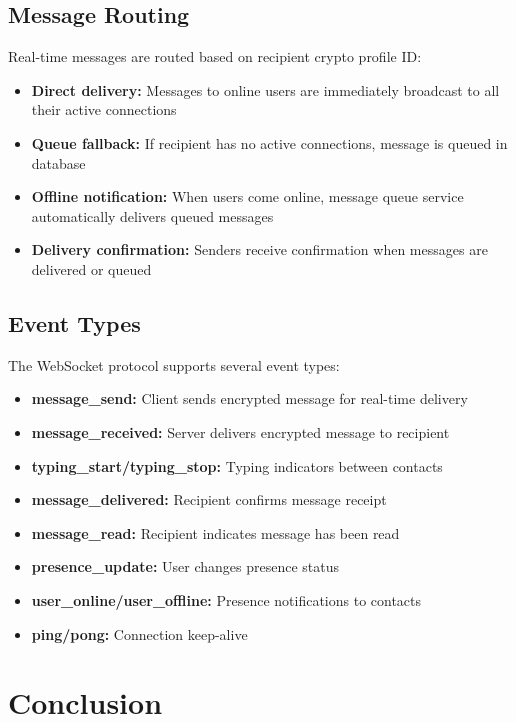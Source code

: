 \documentclass[12pt,a4paper,openany]{book}
\begin{document}
\subsection{Message Routing}

Real-time messages are routed based on recipient crypto profile ID:

\begin{itemize}
\item \textbf{Direct delivery:} Messages to online users are immediately broadcast to all their active connections
\item \textbf{Queue fallback:} If recipient has no active connections, message is queued in database
\item \textbf{Offline notification:} When users come online, message queue service automatically delivers queued messages
\item \textbf{Delivery confirmation:} Senders receive confirmation when messages are delivered or queued
\end{itemize}

\subsection{Event Types}

The WebSocket protocol supports several event types:

\begin{itemize}
\item \textbf{message\_send:} Client sends encrypted message for real-time delivery
\item \textbf{message\_received:} Server delivers encrypted message to recipient
\item \textbf{typing\_start/typing\_stop:} Typing indicators between contacts
\item \textbf{message\_delivered:} Recipient confirms message receipt
\item \textbf{message\_read:} Recipient indicates message has been read
\item \textbf{presence\_update:} User changes presence status
\item \textbf{user\_online/user\_offline:} Presence notifications to contacts
\item \textbf{ping/pong:} Connection keep-alive
\end{itemize}

\section{Conclusion}
\end{document}
